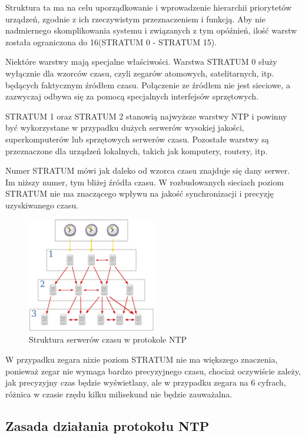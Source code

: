 \documentclass[../main.tex]{subfiles}
\begin{document}
Struktura ta ma na celu uporządkowanie i wprowadzenie hierarchii priorytetów urządzeń, zgodnie z ich rzeczywistym przeznaczeniem i funkcją. 
Aby nie nadmiernego skomplikowania systemu i związanych z tym opóźnień, ilość warstw została ograniczona do 16(STRATUM 0 - STRATUM 15).

Niektóre warstwy mają specjalne właściwości. Warstwa STRATUM 0 służy wyłącznie dla wzorców czasu, czyli zegarów atomowych, satelitarnych, itp. będących faktycznym źródłem czasu.
Połączenie ze źródłem nie jest sieciowe, a zazwyczaj odbywa się za pomocą specjalnych interfejsów sprzętowych.

STRATUM 1 oraz STRATUM 2 stanowią najwyższe warstwy NTP i powinny być wykorzystane w przypadku dużych serwerów
wysokiej jakości, superkomputerów lub sprzętowych serwerów czasu.
Pozostałe warstwy są przeznaczone dla urządzeń lokalnych, takich jak komputery, routery, itp.

Numer STRATUM mówi jak daleko od wzorca czasu znajduje się dany serwer. Im niższy numer, tym bliżej źródła czasu. 
W rozbudowanych sieciach poziom STRATUM nie ma znaczącego wpływu na jakość synchronizacji i precyzję uzyskiwanego czasu.

\begin{figure}[H]
  \centering
  \includegraphics[width=0.5\textwidth]{serwers.png}
  \caption{Struktura serwerów czasu w protokole NTP}
\end{figure}

W przypadku zegara nixie poziom STRATUM nie ma większego znaczenia, ponieważ zegar nie wymaga bardzo precyzyjnego czasu, chociaż oczywiście zależy,
jak precyzyjny czas będzie wyświetlany, ale w przypadku zegara na 6 cyfrach, różnica w czasie rzędu kilku milisekund nie będzie zauważalna.

\subsection{Zasada działania protokołu NTP}
\end{document}
